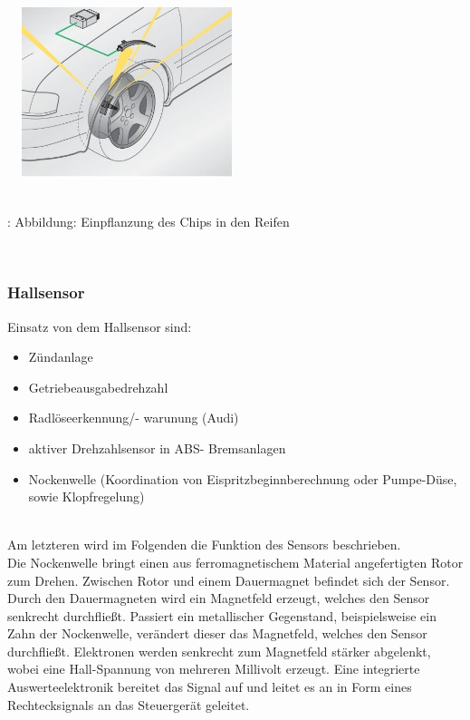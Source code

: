 \documentclass{article}
\begin{document}
				\begin{center}
					\includegraphics[width=7cm, height=5cm] {Images/Kapitel5/rdks.png}
					\caption {\\\cite{TS23}: Abbildung: Einpflanzung des Chips in den Reifen}
				\end{center}\\
				
			\subsubsection{Hallsensor}
				Einsatz von dem Hallsensor sind: 
				\begin{itemize}
					\item Zündanlage
					\item Getriebeausgabedrehzahl
					\item Radlöseerkennung/- warunung (Audi)
					\item aktiver Drehzahlsensor in ABS- Bremsanlagen
					\item Nockenwelle (Koordination von Eispritzbeginnberechnung oder Pumpe-Düse, sowie Klopfregelung)
				\end{itemize}
				\\
				Am letzteren wird im Folgenden die Funktion des Sensors beschrieben.\\
				Die Nockenwelle bringt einen aus ferromagnetischem Material angefertigten Rotor zum Drehen. Zwischen Rotor und einem Dauermagnet befindet sich der Sensor. Durch den Dauermagneten wird ein Magnetfeld erzeugt, welches den Sensor senkrecht durchfließt. Passiert ein metallischer Gegenstand, beispielsweise ein Zahn der Nockenwelle, verändert dieser das Magnetfeld, welches den Sensor durchfließt.
				Elektronen werden senkrecht zum Magnetfeld stärker abgelenkt, wobei eine Hall-Spannung von mehreren Millivolt erzeugt. Eine integrierte Auswerteelektronik bereitet das Signal auf und leitet es an in Form eines Rechtecksignals an das Steuergerät geleitet.\\\cite{TS24}
				
\end{document}
